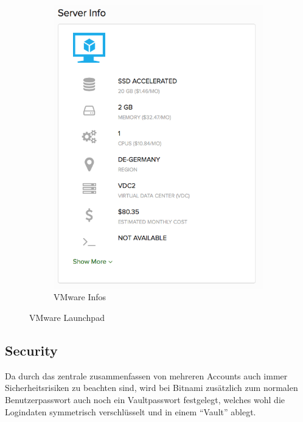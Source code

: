 \begin{figure}[!htbp]
\begin{subfigure}[b]{.39\textwidth}
\includegraphics[width=\textwidth]{./03_Analyse/03_Bitnami/images/vmware_infos}
\caption{VMware Infos}
\end{subfigure}
   \caption{VMware Launchpad}
\end{figure}


  \subsection{Security}
  Da durch das zentrale zusammenfassen von mehreren Accounts auch immer 
Sicherheitsrisiken zu beachten sind, wird bei Bitnami zusätzlich zum normalen 
Benutzerpasswort auch noch ein Vaultpasswort festgelegt, welches wohl die 
Logindaten symmetrisch verschlüsselt und in einem ``Vault'' ablegt.

